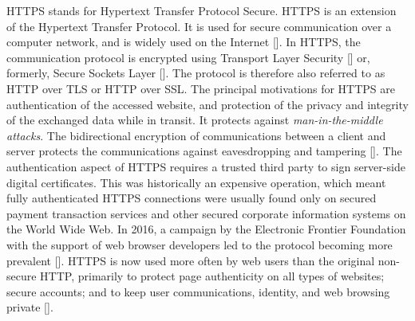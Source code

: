 HTTPS stands for Hypertext Transfer Protocol Secure.
HTTPS is an extension of the Hypertext Transfer Protocol.
It is used for secure communication over a computer network,
and is widely used on the Internet [\cite{lam2000secure, karayiannis2019implementing}].
In HTTPS, the communication protocol is encrypted using Transport Layer Security [\cite{turner2014transport}]
or, formerly, Secure Sockets Layer [\cite{weaver2006secure}].
The protocol is therefore also referred to as HTTP over TLS or HTTP over SSL\@.
The principal motivations for HTTPS are authentication of the accessed website, and protection of the privacy and integrity
of the exchanged data while in transit.
It protects against \textit{man-in-the-middle attacks}.
The bidirectional encryption of communications between a client and server protects the communications against
eavesdropping and tampering [\cite{mayer2016tlscompare, jiang2019physical}].
The authentication aspect of HTTPS requires a trusted third party to sign server-side digital certificates.
This was historically an expensive operation, which meant fully authenticated HTTPS connections were usually found only
on secured payment transaction services and other secured corporate information systems on the World Wide Web.
In 2016, a campaign by the Electronic Frontier Foundation with the support of web browser developers led to the protocol
becoming more prevalent [\cite{he2014shadowcrypt}].
HTTPS is now used more often by web users than the original non-secure HTTP, primarily to protect
page authenticity on all types of websites;
secure accounts;
and to keep user communications, identity, and web browsing private [\cite{rescorla2000rfc2818}].

